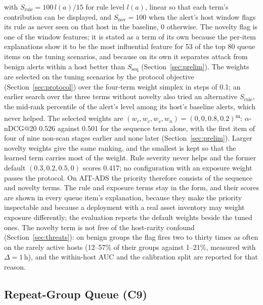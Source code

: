 \documentclass[conference]{IEEEtran}
\newcommand{\meas}{\textsuperscript{\textcolor{green!45!black}{m}}}    %
\begin{document}
with $S_\mathrm{rule} = 100\, l(a)/15$ for rule level $l(a)$, linear so that each term's contribution can be displayed, and $S_\mathrm{nov} = 100$ when the alert's host window flags its rule as never seen on that host in the baseline, 0 otherwise. The novelty flag is one of the window features; it is stated as a term of its own because the per-item explanations show it to be the most influential feature for 53 of the top 80 queue items on the tuning scenarios, and because on its own it separates attack from benign alerts within a host better than $S_\mathrm{seq}$ (Section~\ref{sec:prelim}). The weights are selected on the tuning scenarios by the protocol objective (Section~\ref{sec:protocol}) over the four-term weight simplex in steps of 0.1; an earlier search over the three terms without novelty also tried an alternative $S_\mathrm{rule}$, the mid-rank percentile of the alert's level among its host's baseline alerts, which never helped. The selected weights are $(w_r, w_c, w_s, w_n) = (0, 0, 0.8, 0.2)$\meas{}: $\alpha$-nDCG@20 0.526 against 0.501 for the sequence term alone, with the first item of four of nine non-scan stages earlier and none later (Section~\ref{sec:prelim}). Larger novelty weights give the same ranking, and the smallest is kept so that the learned term carries most of the weight. Rule severity never helps and the former default $(0.3, 0.2, 0.5, 0)$ scores 0.417; no configuration with an exposure weight passes the protocol. On AIT-ADS the priority therefore consists of the sequence and novelty terms. The rule and exposure terms stay in the form, and their scores are shown in every queue item's explanation, because they make the priority inspectable and because a deployment with a real asset inventory may weight exposure differently; the evaluation reports the default weights beside the tuned ones. The novelty term is not free of the host-rarity confound (Section~\ref{sec:threats}): on benign groups the flag fires two to thirty times as often on the rarely active hosts (12--57\% of their groups against 1--21\%, measured with $\Delta = 1$\,h), and the within-host AUC and the calibration split are reported for that reason.

\subsection{Repeat-Group Queue (C9)}
\label{sec:queue}
\end{document}
